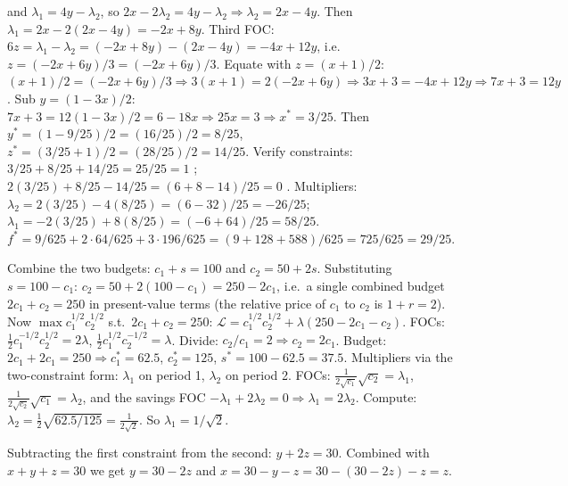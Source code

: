 \begin{solutions}
        and $\lambda_1 = 4 y - \lambda_2$, so
        $2 x - 2 \lambda_2 = 4 y - \lambda_2 \Rightarrow
        \lambda_2 = 2 x - 4 y$. Then
        $\lambda_1 = 2 x - 2(2 x - 4 y) = -2 x + 8 y$. Third FOC:
        $6 z = \lambda_1 - \lambda_2 = (-2 x + 8 y) - (2 x - 4 y)
        = -4 x + 12 y$, i.e.\ $z = (-2 x + 6 y)/3 = (-2 x + 6 y)/3$.
        Equate with $z = (x + 1)/2$:
        $(x + 1)/2 = (-2 x + 6 y)/3 \Rightarrow
        3(x + 1) = 2(-2 x + 6 y) \Rightarrow
        3 x + 3 = -4 x + 12 y \Rightarrow 7 x + 3 = 12 y$. Sub
        $y = (1 - 3 x)/2$: $7 x + 3 = 12(1 - 3 x)/2 = 6 - 18 x
        \Rightarrow 25 x = 3 \Rightarrow x^* = 3/25$. Then
        $y^* = (1 - 9/25)/2 = (16/25)/2 = 8/25$,
        $z^* = (3/25 + 1)/2 = (28/25)/2 = 14/25$. Verify constraints:
        $3/25 + 8/25 + 14/25 = 25/25 = 1$ \checkmark;
        $2(3/25) + 8/25 - 14/25 = (6 + 8 - 14)/25 = 0$ \checkmark.
        Multipliers:
        $\lambda_2 = 2(3/25) - 4(8/25) = (6 - 32)/25 = -26/25$;
        $\lambda_1 = -2(3/25) + 8(8/25) = (-6 + 64)/25 = 58/25$.
        $f^* = 9/625 + 2 \cdot 64/625 + 3 \cdot 196/625
        = (9 + 128 + 588)/625 = 725/625 = 29/25$.
  \item Combine the two budgets: $c_1 + s = 100$ and $c_2 = 50 + 2 s$.
        Substituting $s = 100 - c_1$:
        $c_2 = 50 + 2(100 - c_1) = 250 - 2 c_1$, i.e.\ a single combined
        budget $2 c_1 + c_2 = 250$ in present-value terms (the relative
        price of $c_1$ to $c_2$ is $1 + r = 2$).
        Now $\max c_1^{1/2} c_2^{1/2}$ s.t.\ $2 c_1 + c_2 = 250$:
        $\mathcal{L} = c_1^{1/2} c_2^{1/2}
        + \lambda(250 - 2 c_1 - c_2)$. FOCs:
        $\tfrac{1}{2} c_1^{-1/2} c_2^{1/2} = 2 \lambda$,
        $\tfrac{1}{2} c_1^{1/2} c_2^{-1/2} = \lambda$. Divide:
        $c_2/c_1 = 2 \Rightarrow c_2 = 2 c_1$. Budget:
        $2 c_1 + 2 c_1 = 250 \Rightarrow c_1^* = 62.5$, $c_2^* = 125$,
        $s^* = 100 - 62.5 = 37.5$.
        Multipliers via the two-constraint form: $\lambda_1$ on period 1,
        $\lambda_2$ on period 2. FOCs:
        $\tfrac{1}{2 \sqrt{c_1}}\sqrt{c_2} = \lambda_1$,
        $\tfrac{1}{2 \sqrt{c_2}}\sqrt{c_1} = \lambda_2$, and the savings
        FOC $-\lambda_1 + 2 \lambda_2 = 0 \Rightarrow
        \lambda_1 = 2 \lambda_2$. Compute:
        $\lambda_2 = \tfrac{1}{2}\sqrt{62.5/125} = \tfrac{1}{2 \sqrt{2}}$.
        So $\lambda_1 = 1/\sqrt{2}$.
  \item Subtracting the first constraint from the second:
        $y + 2 z = 30$. Combined with $x + y + z = 30$ we get
        $y = 30 - 2 z$ and $x = 30 - y - z = 30 - (30 - 2 z) - z = z$.

\end{solutions}
